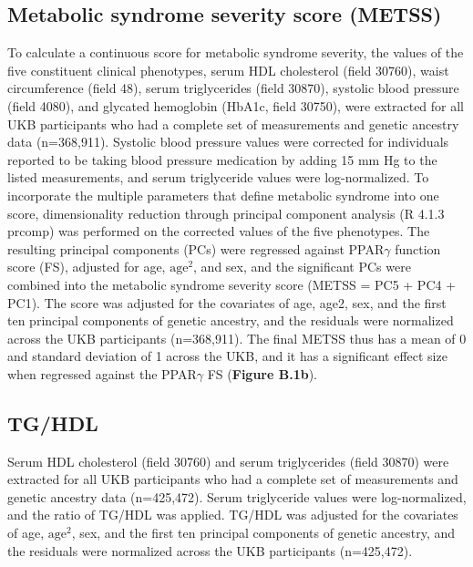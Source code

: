 \subsection{Metabolic syndrome severity score (METSS)}
To calculate a continuous score for metabolic syndrome severity, the values of the five constituent clinical phenotypes\cite{Gurka2014-ib,Cavero-Redondo2019-ce}, serum HDL cholesterol (field 30760), waist circumference (field 48), serum triglycerides (field 30870), systolic blood pressure (field 4080), and glycated hemoglobin (HbA1c, field 30750), were extracted for all UKB participants who had a complete set of measurements and genetic ancestry data (n=368,911). Systolic blood pressure values were corrected for individuals reported to be taking blood pressure medication by adding 15 mm Hg to the listed measurements\cite{Evangelou2018-wo}, and serum triglyceride values were log-normalized. To incorporate the multiple parameters that define metabolic syndrome into one score, dimensionality reduction through principal component analysis (R 4.1.3 prcomp) was performed on the corrected values of the five phenotypes. The resulting principal components (PCs) were regressed against PPAR$\gamma$ function score (FS), adjusted for age, $\mathrm{age}^2$, and sex, and the significant PCs were combined into the metabolic syndrome severity score (METSS = PC5 + PC4 + PC1). The score was adjusted for the covariates of age, age2, sex, and the first ten principal components of genetic ancestry, and the residuals were normalized across the UKB participants (n=368,911). The final METSS thus has a mean of 0 and standard deviation of 1 across the UKB, and it has a significant effect size when regressed against the PPAR$\gamma$ FS (\textbf{Figure B.1b}).

\subsection{TG/HDL}
Serum HDL cholesterol (field 30760) and serum triglycerides (field 30870) were extracted for all UKB participants who had a complete set of measurements and genetic ancestry data (n=425,472). Serum triglyceride values were log-normalized, and the ratio of TG/HDL was applied. TG/HDL was adjusted for the covariates of age, $\mathrm{age}^2$, sex, and the first ten principal components of genetic ancestry, and the residuals were normalized across the UKB participants (n=425,472).

